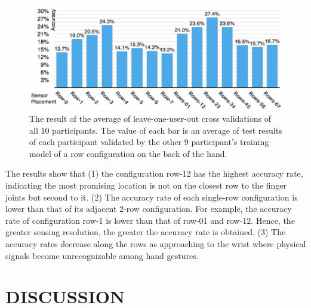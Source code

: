 \documentclass{sigchi}
\begin{document}
\begin{figure}[t]
 \begin{center}
  \includegraphics[width=1\columnwidth]{figures/LOO_V3.pdf}
  \caption{
    The result of the average of leave-one-user-out cross validations of all 10 participants.
    The value of each bar is an average of test results of each participant validated by the other 9 participant's training model of a row configuration on the back of the hand.
  }
  \label{fig:LOO}
  \end{center}
\end{figure}

The results show that
(1) the configuration row-12 has the highest accuracy rate, indicating the most promising location is not on the closest row to the finger joints but second to it. 
(2) The accuracy rate of each single-row configuration is lower than that of its adjacent 2-row configuration. For example, the accuracy rate of configuration row-1 is lower than that of row-01 and row-12. Hence, the greater sensing resolution, the greater the accuracy rate is obtained. 
(3) The accuracy rates decrease along the rows as approaching to the wrist where physical signals become unrecognizable among hand gestures.

\section{DISCUSSION}

\end{document}

